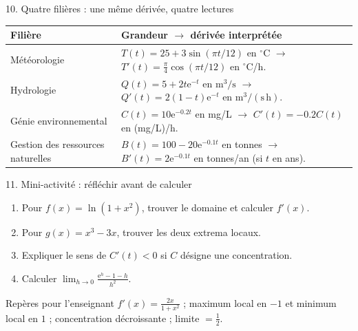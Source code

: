 \documentclass[aspectratio=169,11pt]{beamer}
\newcommand{\e}{\mathrm e}
\begin{document}
\begin{frame}{10. Quatre filières : une même dérivée, quatre lectures}
\small
\begin{tabularx}{\textwidth}{@{}p{}X@{}}
\toprule
Filière & Grandeur $\to$ dérivée interprétée\\
\midrule
Météorologie & $T(t)=25+3\sin(\pi t/12)$ en $^\circ$C $\to$ $T'(t)=\frac\pi4\cos(\pi t/12)$ en $^\circ$C/h.\\[2mm]
Hydrologie & $Q(t)=5+2t\e^{-t}$ en $\mathrm{m^3/s}$ $\to$ $Q'(t)=2(1-t)\e^{-t}$ en $\mathrm{m^3/(s\,h)}$.\\[2mm]
Génie environnemental & $C(t)=10\e^{-0.2t}$ en mg/L $\to$ $C'(t)=-0.2C(t)$ en (mg/L)/h.\\[2mm]
Gestion des ressources naturelles & $B(t)=100-20\e^{-0.1t}$ en tonnes $\to$ $B'(t)=2\e^{-0.1t}$ en tonnes/an (si $t$ en ans).\\
\bottomrule
\end{tabularx}
\vspace{.15cm}{\footnotesize Les modèles sont pédagogiques et non des ajustements de données observées.}
\end{frame}

\begin{frame}{11. Mini-activité : réfléchir avant de calculer}
\begin{enumerate}
\item Pour $f(x)=\ln(1+x^2)$, trouver le domaine et calculer $f'(x)$.
\item Pour $g(x)=x^3-3x$, trouver les deux extrema locaux.
\item Expliquer le sens de $C'(t)<0$ si $C$ désigne une concentration.
\item Calculer $\displaystyle\lim_{h\to0}\frac{\e^h-1-h}{h^2}$.
\end{enumerate}
\begin{exampleblock}{Repères pour l'enseignant}
$f'(x)=\frac{2x}{1+x^2}$ ; maximum local en $-1$ et minimum local en $1$ ; concentration décroissante ; limite $=\frac12$.
\end{exampleblock}
\end{frame}
\end{document}
